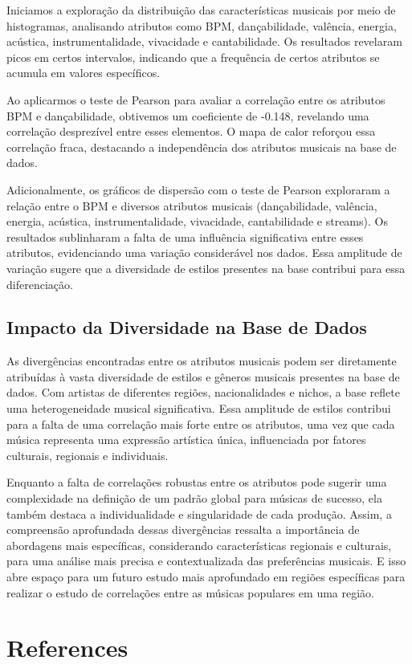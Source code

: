 \documentclass[12pt]{article}
\begin{document}
Iniciamos a exploração da distribuição das características musicais por meio de histogramas, analisando atributos como BPM, dançabilidade, valência, energia, acústica, instrumentalidade, vivacidade e cantabilidade. Os resultados revelaram picos em certos intervalos, indicando que a frequência de certos atributos se acumula em valores específicos.

Ao aplicarmos o teste de Pearson para avaliar a correlação entre os atributos BPM e dançabilidade, obtivemos um coeficiente de -0.148, revelando uma correlação desprezível entre esses elementos. O mapa de calor reforçou essa correlação fraca, destacando a independência dos atributos musicais na base de dados.

Adicionalmente, os gráficos de dispersão com o teste de Pearson exploraram a relação entre o BPM e diversos atributos musicais (dançabilidade, valência, energia, acústica, instrumentalidade, vivacidade, cantabilidade e streams). Os resultados sublinharam a falta de uma influência significativa entre esses atributos, evidenciando uma variação considerável nos dados. Essa amplitude de variação sugere que a diversidade de estilos presentes na base contribui para essa diferenciação.

\subsection{Impacto da Diversidade na Base de Dados}

As divergências encontradas entre os atributos musicais podem ser diretamente atribuídas à vasta diversidade de estilos e gêneros musicais presentes na base de dados. Com artistas de diferentes regiões, nacionalidades e nichos, a base reflete uma heterogeneidade musical significativa. Essa amplitude de estilos contribui para a falta de uma correlação mais forte entre os atributos, uma vez que cada música representa uma expressão artística única, influenciada por fatores culturais, regionais e individuais.

Enquanto a falta de correlações robustas entre os atributos pode sugerir uma complexidade na definição de um padrão global para músicas de sucesso, ela também destaca a individualidade e singularidade de cada produção. Assim, a compreensão aprofundada dessas divergências ressalta a importância de abordagens mais específicas, considerando características regionais e culturais, para uma análise mais precisa e contextualizada das preferências musicais. E isso abre espaço para um futuro estudo mais aprofundado em regiões específicas para realizar o estudo de correlações entre as músicas populares em uma região.


\section{References}




\end{document}

